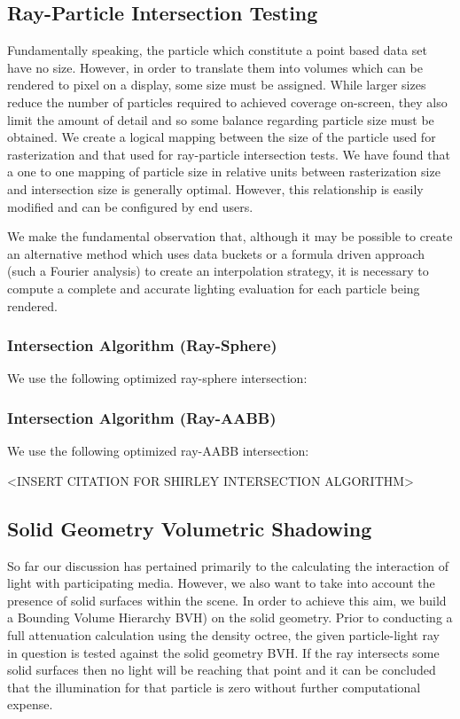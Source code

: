 \documentclass{article}
\begin{document}
\subsection{Ray-Particle Intersection Testing}

Fundamentally speaking, the particle which constitute a point based data set have no size. However, in order to translate them into volumes which can be rendered to pixel on a display, some size must be assigned. While larger sizes reduce the number of particles required to achieved coverage on-screen, they also limit the amount of detail and so some balance regarding particle size must be obtained. We create a logical mapping between the size of the particle used for rasterization and that used for ray-particle intersection tests. We have found that a one to one mapping of particle size in relative units between rasterization size and intersection size is generally optimal. However, this relationship is easily modified and can be configured by end users.

We make the fundamental observation that, although it may be possible to create an alternative method which uses data buckets or a formula driven approach (such a Fourier analysis) to create an interpolation strategy, it is necessary to compute a complete and accurate lighting evaluation for each particle being rendered.

\subsubsection{Intersection Algorithm (Ray-Sphere)}

We use the following optimized ray-sphere intersection\cite{RTR3}:

\subsubsection{Intersection Algorithm (Ray-AABB)}

We use the following optimized ray-AABB intersection:

<INSERT CITATION FOR SHIRLEY INTERSECTION ALGORITHM>

\subsection{Solid Geometry Volumetric Shadowing}

So far our discussion has pertained primarily to the calculating the interaction of light with participating media. However, we also want to take into account the presence of solid surfaces within the scene. In order to achieve this aim, we build a Bounding Volume Hierarchy BVH) on the solid geometry. Prior to conducting a full attenuation calculation using the density octree, the given particle-light ray in question is tested against the solid geometry BVH. If the ray intersects some solid surfaces then no light will be reaching that point and it can be concluded that the illumination for that particle is zero without further computational expense.  
\end{document}
